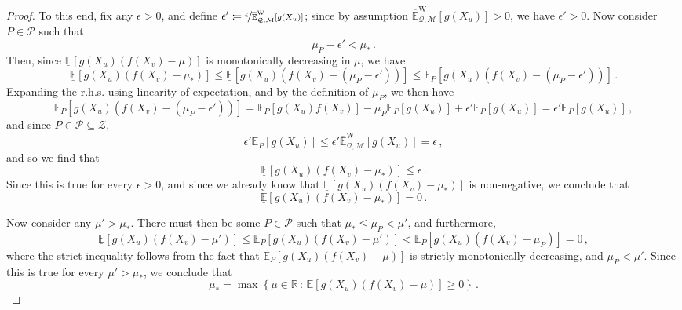 \documentclass[twoside,11pt]{article}
\newcommand{\reals}{\mathbb{R}}
\newcommand{\uexp}{\overline{\mathbb{E}}_{\rateset,\mathcal{M}}^\mathrm{W}}
\newcommand{\rateset}{\mathcal{Q}}
\newcommand{\coloneqq}{:\!=}
\begin{document}
\begin{proof}
To this end, fix any $\epsilon>0$, and define $\epsilon'\coloneqq \nicefrac{\epsilon}{\uexp[g(X_u)]}$; since by assumption $\uexp[g(X_u)]>0$, we have $\epsilon' >0$. Now consider $P\in\mathcal{P}$ such that
\begin{equation*}
\mu_P - \epsilon' < \mu_*\,.
\end{equation*}
Then, since $\underline{\mathbb{E}}[g(X_u)(f(X_v) - \mu)]$ is monotonically decreasing in $\mu$, we have
\begin{equation*}
\underline{\mathbb{E}}[g(X_u)(f(X_v) - \mu_*)] \leq \underline{\mathbb{E}}[g(X_u)(f(X_v) - (\mu_P - \epsilon'))]\leq \mathbb{E}_P[g(X_u)(f(X_v) - (\mu_P - \epsilon'))]\,.
\end{equation*}
Expanding the r.h.s. using linearity of expectation, and by the definition of $\mu_P$, we then have
\begin{equation*}
\mathbb{E}_P[g(X_u)(f(X_v) - (\mu_P - \epsilon'))] = \mathbb{E}_P[g(X_u)f(X_v)] - \mu_P\mathbb{E}_P[g(X_u)] + \epsilon'\mathbb{E}_P[g(X_u)] = \epsilon'\mathbb{E}_P[g(X_u)]\,,
\end{equation*}
and since $P\in\mathcal{P}\subseteq\mathcal{Z}$,
\begin{equation*}
\epsilon'\mathbb{E}_P[g(X_u)] \leq \epsilon'\uexp[g(X_u)]=\epsilon\,,
\end{equation*}
and so we find that
\begin{equation*}
\underline{\mathbb{E}}[g(X_u)(f(X_v) - \mu_*)] \leq \epsilon\,.
\end{equation*}
Since this is true for every $\epsilon>0$, and since we already know that $\underline{\mathbb{E}}[g(X_u)(f(X_v) - \mu_*)]$ is non-negative, we conclude that
\begin{equation*}
\underline{\mathbb{E}}[g(X_u)(f(X_v) - \mu_*)] = 0\,.
\end{equation*}

Now consider any $\mu' > \mu_*$. There must then be some $P\in\mathcal{P}$ such that $\mu_*\leq \mu_P < \mu'$, and furthermore,
\begin{equation*}
\underline{\mathbb{E}}[g(X_u)(f(X_v) - \mu')] \leq \mathbb{E}_P[g(X_u)(f(X_v) - \mu')] < \mathbb{E}_P[g(X_u)(f(X_v) - \mu_P)] = 0\,,
\end{equation*}
where the strict inequality follows from the fact that $\mathbb{E}_P[g(X_u)(f(X_v) - \mu)]$ is strictly monotonically decreasing, and $\mu_P<\mu'$. Since this is true for every $\mu'>\mu_*$, we conclude that
\begin{equation*}
\mu_* = \max\left\{ \mu\in\reals\,:\, \underline{\mathbb{E}}[g(X_u)(f(X_v) - \mu)] \geq 0 \right\}\,.
\end{equation*}


\end{proof}
\end{document}
